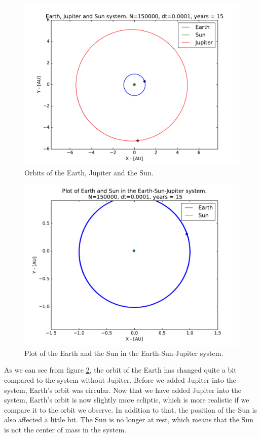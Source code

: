 \documentclass[12pt]{article}
\begin{document}
\begin{figure}[!h]
\centering
\includegraphics[width=\linewidth]{Plots/Earth_Sun_Jupiter.pdf}
\caption{Orbits of the Earth, Jupiter and the Sun.}
\label{fig:EJS_2D_Orbit}
\end{figure}

\begin{figure}[!h]
\centering
\includegraphics[width=\linewidth]{Plots/ESJ_EarthandSun.pdf}
\caption{Plot of the Earth and the Sun in the Earth-Sun-Jupiter system.}
\label{fig:EJS_Earth_and_sun}
\end{figure}

As we can see from figure \ref{fig:EJS_Earth_and_sun}, the orbit of the Earth has changed quite a bit compared to the system without Jupiter. Before we added Jupiter into the system, Earth's orbit was circular. Now that we have added Jupiter into the system, Earth's orbit is now slightly more ecliptic, which is more realistic if we compare it to the orbit we observe. In addition to that, the position of the Sun is also affected a little bit. The Sun is no longer at rest, which means that the Sun is not the center of mass in the system.
\end{document}
